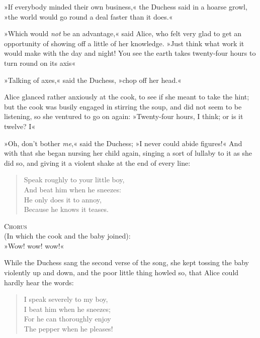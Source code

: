 »If everybody minded their own business,« the Duchess said in a hoarse growl, »the world would go round a deal faster than it does.«


»Which would \textit{not} be an advantage,« said Alice, who felt very glad to get an opportunity of showing off a little of her knowledge. »Just think what work it would make with the day and night! You see the earth takes twenty-four hours to turn round on its axis\longdash«

»Talking of axes,« said the Duchess, »chop off her head.«

Alice glanced rather anxiously at the cook, to see if she meant to take the hint; but the cook was busily engaged in stirring the soup, and did not seem to be listening, so she ventured to go on again: »Twenty-four hours, I think; or is it twelve? I\longdash«

»Oh, don't bother \textit{me},« said the Duchess; »I never could abide figures!« And with that she began nursing her child again, singing a sort of lullaby to it as she did so, and giving it a violent shake at the end of every line:

\begin{letter}
	\pagebreak[4]
\end{letter}

\begin{verse}
	\begin{altverse}
Speak roughly to your little boy,\\
And beat him when he sneezes:\\
He only does it to annoy,\\
Because he knows it teases.\\
\end{altverse}
\end{verse}

\begin{center}
\textsc{Chorus}\\
(In which the cook and the baby joined):\\
»Wow! wow! wow!«
\end{center}

While the Duchess sang the second verse of the song, she kept tossing the baby violently up and down, and the poor little thing howled so, that Alice could hardly hear the words:

\begin{verse}
	\begin{altverse}
I speak severely to my boy,\\
I beat him when he sneezes;\\
For he can thoroughly enjoy\\
The pepper when he pleases!\\
\end{altverse}
\end{verse}

